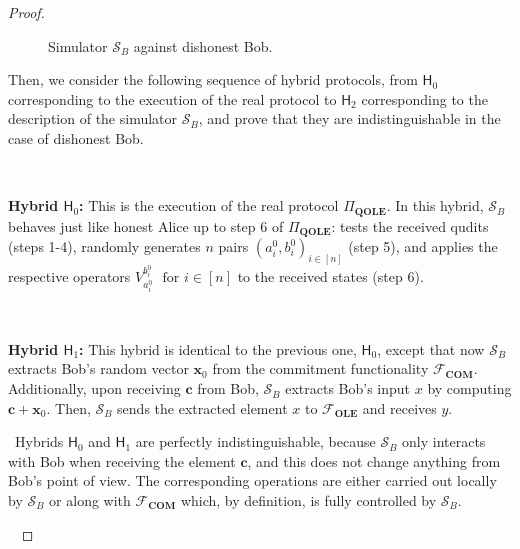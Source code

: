 \begin{proof}
\begin{figure}[h!]
\begin{tcolorbox}
        \end{tcolorbox}
\caption{Simulator $\mathcal{S}_B$ against dishonest Bob.}
\label{fig:simulator_dis_Bob}
\end{figure}
Then, we consider the following sequence of hybrid protocols, from $\mathsf{H}_0$ corresponding to the execution of the real protocol to $\mathsf{H}_2$ corresponding to the description of the simulator $\mathcal{S}_B$, and prove that they are indistinguishable in the case of dishonest Bob.

\

\textbf{Hybrid $\mathsf{H}_0$:} This is the execution of the real protocol $\Pi_{\textbf{QOLE}}$. In this hybrid, $\mathcal{S}_B$ behaves just like honest Alice up to step 6 of $\Pi_{\textbf{QOLE}}$:  tests the received qudits  (steps 1-4), randomly generates $n$ pairs $(a^0_i, b^0_i)_{ i\in [n]}$ (step 5), and applies the respective operators $V^{b^0_i}_{a^0_i}$ ${ \text{ for } i\in [n]}$ to the received states (step 6).

\

\textbf{Hybrid $\mathsf{H}_1$:} This hybrid is identical to the previous one, $\mathsf{H}_0$, except that now $\mathcal{S}_B$ extracts Bob's random vector $\bm{x}_0$ from the commitment functionality $\mathcal{F}_{\textbf{COM}}$. Additionally, upon receiving $\bm{c}$ from Bob, $\mathcal{S}_B$ extracts Bob's input $x$ by computing $\bm{c} + \bm{x}_0$. Then,  $\mathcal{S}_B$ sends the extracted element $x$ to  $\mathcal{F}_{\textbf{OLE}}$ and receives $y$.

\ 
 Hybrids $\mathsf{H}_0$ and $\mathsf{H}_1$ are perfectly indistinguishable, because $\mathcal{S}_B$ only interacts with Bob when receiving the element $\bm{c}$, and this does not change anything from Bob's point of view. The corresponding operations are either carried out locally by $\mathcal{S}_B$ or along with  $\mathcal{F}_{\textbf{COM}}$ which, by definition, is fully controlled by $\mathcal{S}_B$.

\


\end{proof}

